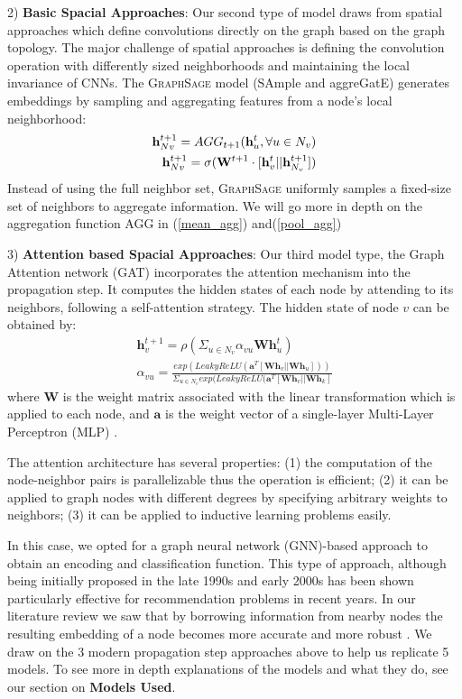\documentclass[sigconf, nonacm]{acmart}
\begin{document}
2) \textbf{Basic Spacial Approaches}: 
Our second type of model draws from spatial approaches which define convolutions directly on the graph based on the graph topology. The major challenge of spatial approaches is defining the convolution operation with differently sized neighborhoods and maintaining the local invariance of CNNs.
The \textsc{GraphSage} model (SAmple and aggreGatE) \cite{Hamiltonetal.2017} generates embeddings by sampling and aggregating features from a node’s local neighborhood:
\begin{align} 
    \mathbf{h}_{Nv}^{t+1} = AGG_{t+1}({\mathbf{h}_u^{t}, \forall u \in N_v}) \\
    \mathbf{h}_{Nv}^{t+1} = \sigma(\mathbf{W}^{t+1} \cdot [\mathbf{h}^t_v || \mathbf{h}^{t+1}_{N_v}])
    \label{\textsc{GraphSage}_eq}
\end{align} 
Instead of using the full neighbor set, \textsc{GraphSage} uniformly samples a fixed-size set of neighbors to aggregate information. We will go more in depth on the aggregation function AGG in (\ref{mean_agg}) and(\ref{pool_agg})

3) \textbf{Attention based Spacial Approaches}:  Our third model type, the Graph Attention network (GAT) \cite{Velickovic2017} incorporates the attention mechanism into the propagation step. It computes the hidden states of each node by attending to its neighbors, following a self-attention strategy. The hidden state of node $v$ can be obtained by:
\begin{align} 
    \mathbf{h}_v^{t+1} = \rho (\Sigma_{u \in N_v} \alpha_{vu}\mathbf{W}\mathbf{h}^t_u)\\
    \alpha_{vu} = \frac{exp(LeakyReLU(\mathbf{a}^T [\mathbf{W}\mathbf{h}_v || \mathbf{W}\mathbf{h}_u] ))}{\Sigma_{u \in N_v} exp(LeakyReLU(\mathbf{a}^T [\mathbf{W}\mathbf{h}_v || \mathbf{W}\mathbf{h}_k]}
    \label{attention}
\end{align} 
where $\mathbf{W}$ is the weight matrix associated with the linear transformation which is applied to each node, and $\mathbf{a}$ is the weight vector of a single-layer Multi-Layer Perceptron (MLP) \cite{Hinton1985}.

The attention architecture has several properties: (1) the computation of the node-neighbor pairs is parallelizable thus the operation is efficient; (2) it can be applied to graph nodes with different degrees by specifying arbitrary weights to neighbors; (3) it can be applied to inductive learning problems easily.

In this case, we opted for a graph neural network (GNN)-based approach to obtain an encoding and classification function. This type of approach, although being initially proposed in the late 1990s and early 2000s \cite{Alessandro1997} has been shown particularly effective for recommendation problems \cite{Ruining2018} in recent years. In our literature review we saw that by borrowing information from nearby nodes the resulting embedding of a node becomes more accurate and more robust \cite{Ankit2019}. We draw on the 3 modern propagation step approaches above to help us replicate 5 models. To see more in depth explanations of the models and what they do, see our section on \textbf{Models Used}.  
\end{document}
